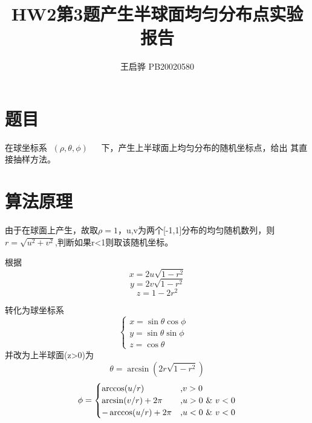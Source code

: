 \documentclass{article}
\title{\songti \zihao{2}\bfseries HW2第3题产生半球面均匀分布点实验报告}
\author{王启骅 PB20020580}
\begin{document}
	\maketitle
	\section{题目}
	在球坐标系 $ (\rho,\theta,\phi) $   下，产生上半球面上均匀分布的随机坐标点，给出
	其直接抽样方法。
	\section{算法原理}
由于在球面上产生，故取$ \rho=1 $，u,v为两个[-1,1]分布的均匀随机数列，则$ r=\sqrt{u^2+v^2} $,判断如果r<1则取该随机坐标。


根据
\begin{equation}
	x=2u\sqrt{1-r^2}
\end{equation}
\begin{equation}
	y=2v\sqrt{1-r^2}
\end{equation}
\begin{equation}
	z=1-2r^2
\end{equation}


转化为球坐标系
\begin{equation}
	\begin{cases}
		x=\sin\theta\cos\phi&\\
		y=\sin\theta\sin\phi&\\
		z=\cos\theta&
	\end{cases}
\end{equation}
并改为上半球面(z>0)为
\begin{equation}
	\theta=\arcsin(2r\sqrt{1-r^2})
\end{equation}
\begin{equation}
	\phi=
	\begin{cases}
		\arccos(u/r)& \text{,$v>0 $}\\
		\arcsin(v/r)+2\pi&\text{,$ u>0\ \&\ v<0 $}\\
		-\arccos(u/r)+2\pi&\text{,$ u<0\ \&\ v<0 $}
	\end{cases}
\end{equation}
\end{document}
